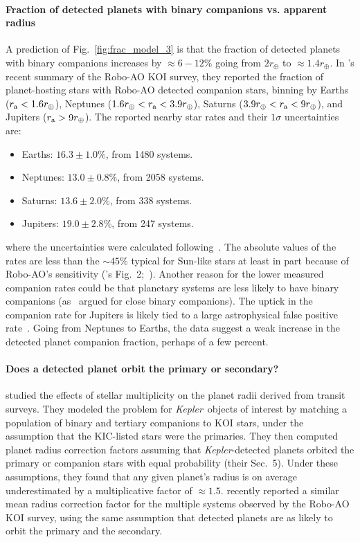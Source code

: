 \documentclass[12pt,modern]{aastex61}
\renewcommand{\a}{_{\rm a}}
\begin{document}
\paragraph{Fraction of detected planets with binary companions vs. apparent 
radius}
A prediction of Fig.~\ref{fig:frac_model_3} is that the fraction of detected 
planets with binary companions increases by $\approx 6-12\%$ going from 
$2r_\oplus$ to $\approx 1.4r_\oplus$.
In \citet{ziegler_robo-ao_2017}'s recent summary of the Robo-AO KOI survey, 
they reported the fraction of planet-hosting stars with Robo-AO detected 
companion stars, binning by Earths ($r\a < 1.6r_\oplus$), Neptunes 
($1.6r_\oplus < r\a < 3.9 r_\oplus$), Saturns ($3.9r_\oplus < r\a < 9 
r_\oplus$), and Jupiters ($r\a > 9r_\oplus$).
The reported nearby star rates and their $1\sigma$ uncertainties are:
\begin{itemize}
    \item Earths: $16.3 \pm 1.0\%$, from 1480 systems.
    \item Neptunes: $13.0 \pm 0.8\%$, from 2058 systems.
    \item Saturns: $13.6 \pm 2.0\%$, from 338 systems.
    \item Jupiters: $19.0 \pm 2.8\%$, from 247 systems.
\end{itemize} 
where the uncertainties were calculated 
following~\citet{burgasser_binarity_2003}.
The absolute values of the rates are less than the $\sim 45\%$ typical for 
Sun-like stars at least in part because of Robo-AO's sensitivity 
(\citealt{ziegler_robo-ao_2017}'s Fig.~2;~\citealt{raghavan_survey_2010}).
Another reason for the lower measured companion rates could be that planetary 
systems are less likely to have 
binary companions (as~\citealt{kraus_impact_2016} argued for close binary 
companions).
The uptick in the companion rate for Jupiters is likely tied to a large 
astrophysical false positive rate~\citep{santerne_sophie_2012}.
Going from Neptunes to Earths, the data suggest a weak increase in the 
detected planet companion fraction, perhaps of a few percent.


\paragraph{Does a detected planet orbit the primary or secondary?}
\citet{ciardi_understanding_2015} studied the effects of stellar multiplicity 
on the planet radii derived from transit surveys.
They modeled the problem for {\it Kepler}\ objects of interest by matching a 
population of binary and tertiary companions to KOI stars, 
under the assumption that the KIC-listed stars were the primaries.
They then computed planet radius correction factors assuming that {\it 
    Kepler}-detected planets orbited the primary or companion stars
with equal probability (their Sec.~5).
Under these assumptions, they found that any given planet's radius is on 
average underestimated by a multiplicative factor of $\approx\! 1.5$.
\citet{ziegler_robo-ao_2017} recently reported a similar mean radius 
correction factor for the multiple systems observed by the Robo-AO KOI survey, 
using the same assumption that detected planets are as likely to orbit the 
primary and the secondary.
\end{document}
